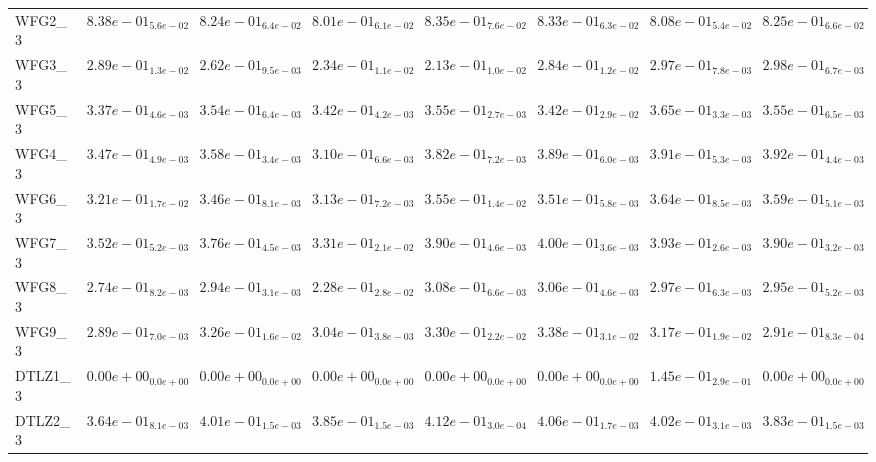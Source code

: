 \documentclass{article}
\begin{document}
\begin{landscape}
\begin{table}
\begin{scriptsize}
\begin{tabular}{llllllll}
WFG2\_3 & \cellcolor{gray95}$  8.38e-01_{ 5.6e-02}$ & $  8.24e-01_{ 6.4e-02}$ & $  8.01e-01_{ 6.1e-02}$ & \cellcolor{gray25}$  8.35e-01_{ 7.6e-02}$ & $  8.33e-01_{ 6.3e-02}$ & $  8.08e-01_{ 5.4e-02}$ & $  8.25e-01_{ 6.6e-02}$ \\
WFG3\_3 & $  2.89e-01_{ 1.3e-02}$ & $  2.62e-01_{ 9.5e-03}$ & $  2.34e-01_{ 1.1e-02}$ & $  2.13e-01_{ 1.0e-02}$ & $  2.84e-01_{ 1.2e-02}$ & \cellcolor{gray25}$  2.97e-01_{ 7.8e-03}$ & \cellcolor{gray95}$  2.98e-01_{ 6.7e-03}$ \\
WFG5\_3 & $  3.37e-01_{ 4.6e-03}$ & $  3.54e-01_{ 6.4e-03}$ & $  3.42e-01_{ 4.2e-03}$ & \cellcolor{gray25}$  3.55e-01_{ 2.7e-03}$ & $  3.42e-01_{ 2.9e-02}$ & \cellcolor{gray95}$  3.65e-01_{ 3.3e-03}$ & $  3.55e-01_{ 6.5e-03}$ \\
WFG4\_3 & $  3.47e-01_{ 4.9e-03}$ & $  3.58e-01_{ 3.4e-03}$ & $  3.10e-01_{ 6.6e-03}$ & $  3.82e-01_{ 7.2e-03}$ & $  3.89e-01_{ 6.0e-03}$ & \cellcolor{gray25}$  3.91e-01_{ 5.3e-03}$ & \cellcolor{gray95}$  3.92e-01_{ 4.4e-03}$ \\
WFG6\_3 & $  3.21e-01_{ 1.7e-02}$ & $  3.46e-01_{ 8.1e-03}$ & $  3.13e-01_{ 7.2e-03}$ & $  3.55e-01_{ 1.4e-02}$ & $  3.51e-01_{ 5.8e-03}$ & \cellcolor{gray95}$  3.64e-01_{ 8.5e-03}$ & \cellcolor{gray25}$  3.59e-01_{ 5.1e-03}$ \\
WFG7\_3 & $  3.52e-01_{ 5.2e-03}$ & $  3.76e-01_{ 4.5e-03}$ & $  3.31e-01_{ 2.1e-02}$ & $  3.90e-01_{ 4.6e-03}$ & \cellcolor{gray95}$  4.00e-01_{ 3.6e-03}$ & \cellcolor{gray25}$  3.93e-01_{ 2.6e-03}$ & $  3.90e-01_{ 3.2e-03}$ \\
WFG8\_3 & $  2.74e-01_{ 8.2e-03}$ & $  2.94e-01_{ 3.1e-03}$ & $  2.28e-01_{ 2.8e-02}$ & \cellcolor{gray95}$  3.08e-01_{ 6.6e-03}$ & \cellcolor{gray25}$  3.06e-01_{ 4.6e-03}$ & $  2.97e-01_{ 6.3e-03}$ & $  2.95e-01_{ 5.2e-03}$ \\
WFG9\_3 & $  2.89e-01_{ 7.0e-03}$ & $  3.26e-01_{ 1.6e-02}$ & $  3.04e-01_{ 3.8e-03}$ & \cellcolor{gray25}$  3.30e-01_{ 2.2e-02}$ & \cellcolor{gray95}$  3.38e-01_{ 3.1e-02}$ & $  3.17e-01_{ 1.9e-02}$ & $  2.91e-01_{ 8.3e-04}$ \\
DTLZ1\_3 & $  0.00e+00_{ 0.0e+00}$ & $  0.00e+00_{ 0.0e+00}$ & $  0.00e+00_{ 0.0e+00}$ & $  0.00e+00_{ 0.0e+00}$ & $  0.00e+00_{ 0.0e+00}$ & \cellcolor{gray95}$  1.45e-01_{ 2.9e-01}$ & $  0.00e+00_{ 0.0e+00}$ \\
DTLZ2\_3 & $  3.64e-01_{ 8.1e-03}$ & $  4.01e-01_{ 1.5e-03}$ & $  3.85e-01_{ 1.5e-03}$ & \cellcolor{gray95}$  4.12e-01_{ 3.0e-04}$ & \cellcolor{gray25}$  4.06e-01_{ 1.7e-03}$ & $  4.02e-01_{ 3.1e-03}$ & $  3.83e-01_{ 1.5e-03}$ \\

\end{tabular}
\end{scriptsize}
\end{table}
\end{landscape}
\end{document}
